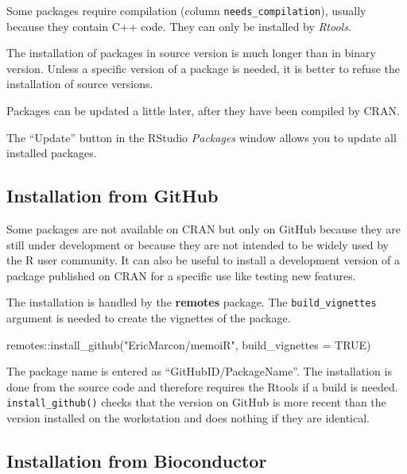 \documentclass[
  12pt,
  american,
  a4paper,
  extrafontsizes,onecolumn,openright
  ]{memoir}
\newenvironment{Shaded}{\begin{snugshade}}{\end{snugshade}}
\newcommand{\AttributeTok}[1]{\textcolor[rgb]{0.77,0.63,0.00}{#1}}
\newcommand{\ConstantTok}[1]{\textcolor[rgb]{0.00,0.00,0.00}{#1}}
\newcommand{\FunctionTok}[1]{\textcolor[rgb]{0.00,0.00,0.00}{#1}}
\newcommand{\NormalTok}[1]{#1}
\newcommand{\SpecialCharTok}[1]{\textcolor[rgb]{0.00,0.00,0.00}{#1}}
\newcommand{\StringTok}[1]{\textcolor[rgb]{0.31,0.60,0.02}{#1}}
\begin{document}
Some packages require compilation (column \texttt{needs\_compilation}), usually because they contain C++ code.
They can only be installed by \emph{Rtools}.

The installation of packages in source version is much longer than in binary version.
Unless a specific version of a package is needed, it is better to refuse the installation of source versions.

Packages can be updated a little later, after they have been compiled by CRAN.

The \enquote{Update} button in the RStudio \emph{Packages} window allows you to update all installed packages.

\hypertarget{installation-from-github}{%
\subsection{Installation from GitHub}\label{installation-from-github}}

Some packages are not available on CRAN but only on GitHub because they are still under development or because they are not intended to be widely used by the R user community.
It can also be useful to install a development version of a package published on CRAN for a specific use like testing new features.

The installation is handled by the \textbf{remotes} package.
The \texttt{build\_vignettes} argument is needed to create the vignettes of the package.

\scriptsize

\begin{Shaded}
\begin{Highlighting}[]
\NormalTok{remotes}\SpecialCharTok{::}\FunctionTok{install\_github}\NormalTok{(}\StringTok{"EricMarcon/memoiR"}\NormalTok{, }\AttributeTok{build\_vignettes =} \ConstantTok{TRUE}\NormalTok{)}
\end{Highlighting}
\end{Shaded}

\normalsize

The package name is entered as \enquote{GitHubID/PackageName}.
The installation is done from the source code and therefore requires the Rtools if a build is needed.
\texttt{install\_github()} checks that the version on GitHub is more recent than the version installed on the workstation and does nothing if they are identical.

\hypertarget{installation-from-bioconductor}{%
\subsection{Installation from Bioconductor}\label{installation-from-bioconductor}}
\end{document}
